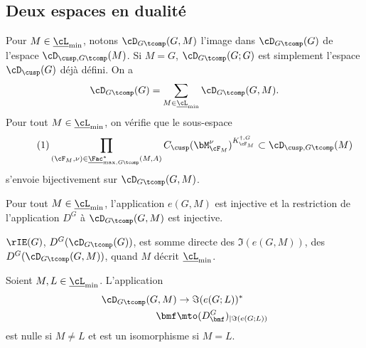 \subsection{Deux espaces en dualité}\label{deuxespaces}

Pour $M\in \underline{\cL}_{\min}$, notons $\cD_{G\tcomp}(G,M)$ l'image dans $\cD_{G\tcomp}(G)$ de
l'espace $\cD_{\cusp,G\tcomp}(M)$. Si $M=G$, $\cD_{G\tcomp}(G;G)$ est simplement l'espace $\cD_{\cusp}(G)$ déjà défini. On a
\[
\cD_{G\tcomp}(G)=\sum_{M\in \underline{\cL}_{\min}}\cD_{G\tcomp}(G,M).
\]
Pour tout $M\in \underline{\cL}_{\min}$,
on vérifie que le sous-espace
\begin{equation}\tag{1}\label{deuxespaces1}
\prod_{(\cF_{M},\nu)\in \underline{\Fac}^*_{\max,G\tcomp}(M,A)}C_{\cusp}(\bM^{\nu}_{\cF_{M}})^{K_{\cF_{M}}^{\dag,G}}\subset \boldsymbol{\cD}_{\cusp,G\tcomp}(M)
\end{equation}
s'envoie bijectivement sur $\cD_{G\tcomp}(G,M)$.

\skpt
\begin{prop*}
\begin{enumeratei}
\item\label{deuxespacesi}
Pour tout $M\in \underline{\cL}_{\min}$, l'application $e(G,M)$ est injective et la restriction de l'application $D^G$ à $\cD_{G\tcomp}(G,M)$ est injective.

\item\label{deuxespacesii}
$\rIE(G)$, \resp $D^G(\cD_{G\tcomp}(G))$, est somme directe des $\Im(e(G,M))$, \resp des $D^G(\cD_{G\tcomp}(G,M))$, quand $M$ décrit $\underline{\cL}_{\min}$.

\item\label{deuxespacesiii}
Soient $M,L\in \underline{\cL}_{\min}$. L'application
\begin{align*}
\cD_{G\tcomp}(G,M)&\to \Im(e(G;L))^*\\
\bmf&\mto (D^G_{\bmf})_{\vert \Im(e(G;L))}
\end{align*}
est nulle si $M\neq L$ et est un isomorphisme si $M=L$.
\end{enumeratei}
\end{prop*}

